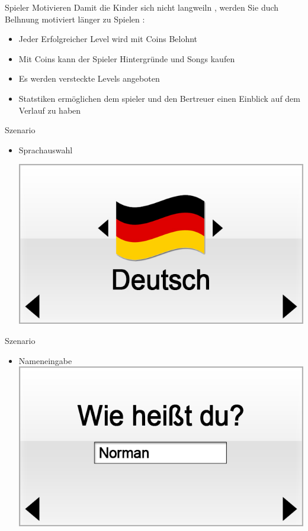 \documentclass[18pt]{beamer}
\begin{document}
\begin{frame}{Spieler Motivieren}
Damit die Kinder sich nicht langweiln , werden Sie duch Belhnung motiviert länger zu Spielen :
\begin{itemize}[<+->]
\item Jeder Erfolgreicher Level wird mit Coins Belohnt
\item Mit Coins kann der Spieler Hintergründe und Songs kaufen 
\item Es werden versteckte Levels angeboten 
\item Statstiken ermöglichen dem spieler und den Bertreuer einen Einblick auf dem Verlauf zu haben 
\end{itemize}
\end{frame}
\begin{frame}{Szenario}
\begin{itemize}
\item Sprachauswahl
 
\includegraphics[scale=0.5]{../gui/_jpeg/registration1}


\end{itemize}
\end{frame}

\begin{frame}{Szenario}
\begin{itemize}
\item Nameneingabe
\includegraphics[scale=0.5]{../gui/_jpeg/registration2}
\end{itemize}
\end{frame}
\end{document}
